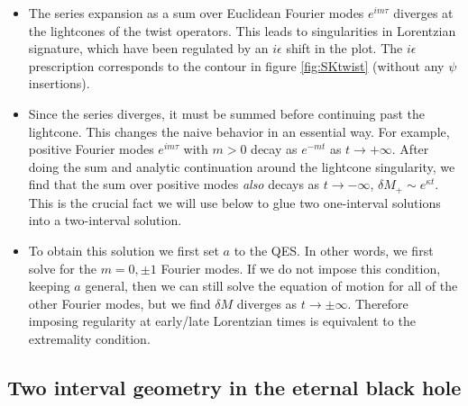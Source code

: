 \documentclass[12pt]{article}
\numberwithin{equation}{section}
\begin{document}
\begin{spacing}{1.1}
\begin{itemize}

\item   The series expansion as a sum over Euclidean Fourier modes $e^{i m \tau}$ diverges at the lightcones of the twist operators. This leads to singularities in Lorentzian signature, which have been regulated by an $i\epsilon$ shift in the plot. The $i\epsilon$ prescription corresponds to the contour in figure \ref{fig:SKtwist} (without any $\psi$ insertions).

\item Since the series diverges, it must be summed before continuing past the lightcone. This changes the naive behavior in an essential way. For example, positive Fourier modes $e^{i m \tau}$ with $m>0$ decay as $e^{-mt}$ as $t \to +\infty$. After doing the sum and analytic continuation around the lightcone singularity, we find that the sum over positive modes \textit{also} decays as $t \to -\infty$, $\delta M_+ \sim e^{\kappa t}$. This is the crucial fact we will use below to glue two one-interval solutions into a two-interval solution.

\item To obtain this solution we first set $a$ to the QES. In other words, we first solve for the $m=0,\pm 1$ Fourier modes. If we do not impose this condition, keeping $a$ general, then we can still solve the equation of motion for all of the other Fourier modes, but we find $\delta M$ diverges as $t \to \pm \infty$. Therefore imposing regularity at early/late Lorentzian times is equivalent to the extremality condition.



\end{itemize}  
  




 \subsection{Two interval geometry in the eternal black hole}
 

\end{spacing}
\end{document}
